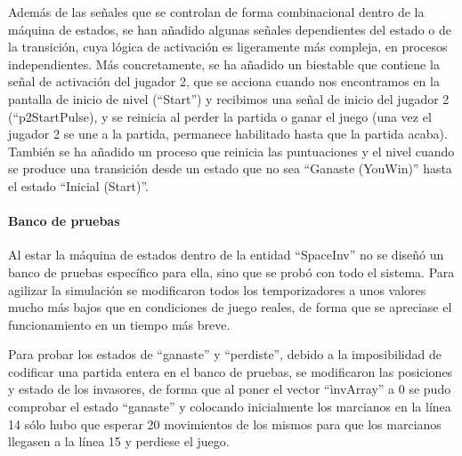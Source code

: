 Además de las señales que se controlan de forma combinacional dentro de la máquina de estados, se han añadido algunas señales dependientes del estado o de la transición, cuya lógica de activación es ligeramente más compleja, en procesos independientes. 
Más concretamente, se ha añadido un biestable que contiene la señal de activación del jugador 2, que se acciona cuando nos encontramos en la pantalla de inicio de nivel (``Start'') y recibimos una señal de inicio del jugador 2 (``p2StartPulse), y se reinicia al perder la partida o ganar el juego (una vez el jugador 2 se une a la partida, permanece habilitado hasta que la partida acaba). También se ha añadido un proceso que reinicia las puntuaciones y el nivel cuando se produce una transición desde un estado que no sea ``Ganaste (YouWin)'' hasta el estado ``Inicial (Start)''.

\paragraph{Banco de pruebas}
Al estar la máquina de estados dentro de la entidad ``SpaceInv'' no se diseñó un banco de pruebas específico para ella, sino que se probó con todo el sistema. Para agilizar la simulación se modificaron todos los temporizadores a unos valores mucho más bajos que en condiciones de juego reales, de forma que se apreciase el funcionamiento en un tiempo más breve. 

Para probar los estados de ``ganaste'' y ``perdiste'', debido a la imposibilidad de codificar una partida entera en el banco de pruebas, se modificaron las posiciones y estado de los invasores, de forma que al poner el vector ``ìnvArray'' a 0 se pudo comprobar el estado ``ganaste'' y colocando inicialmente los marcianos en la línea 14 sólo hubo que esperar 20 movimientos de los mismos para que los marcianos llegasen a la línea 15 y perdiese el juego.